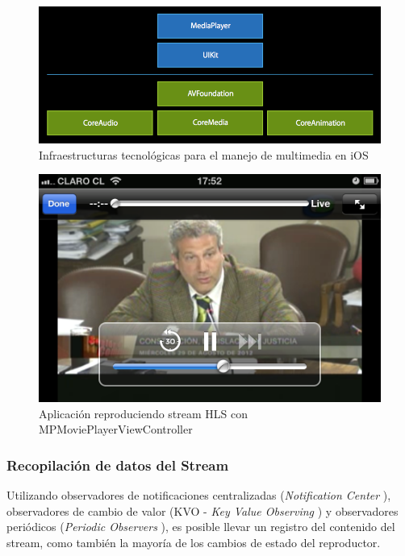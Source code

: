 \begin{figure}[H]
	\centering
	\includegraphics[scale=0.5]{imgs/ios-tech-frameworks.png}
	\caption{Infraestructuras tecnológicas para el manejo de multimedia en iOS}
	\label{IMG-ios-tech-frameworks}	
\end{figure}

\begin{figure}[H]
	\centering
	\includegraphics[scale=0.3]{imgs/mpmpvc-example.png}
	\caption{Aplicación reproduciendo stream HLS con MPMoviePlayerViewController}
	\label{IMG-mpmpvc-example}	
\end{figure}

		\subsubsection{Recopilación de datos del Stream}
Utilizando observadores de notificaciones centralizadas (\textit{Notification Center} \cite{bib:ios-nsnotificationcenter}), observadores de cambio de valor (KVO - \textit{Key Value Observing} \cite{bib:kvo-guide}) y observadores periódicos (\textit{Periodic Observers} \cite{bib:avplayer-periodic}), es posible llevar un registro del contenido del stream, como también la mayoría de los cambios de estado del reproductor.\\

